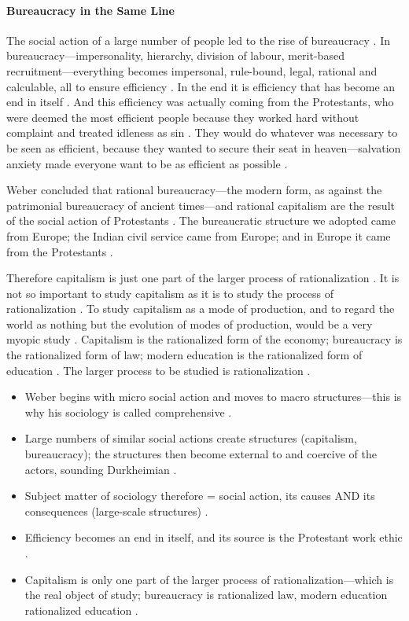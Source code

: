 \paragraph{Bureaucracy in the Same Line}
The social action of a large number of people led to the rise of bureaucracy . In bureaucracy---impersonality, hierarchy, division of labour, merit-based recruitment---everything becomes impersonal, rule-bound, legal, rational and calculable, all to ensure efficiency .
In the end it is efficiency that has become an end in itself . And this efficiency was actually coming from the Protestants, who were deemed the most efficient people because they worked hard without complaint and treated idleness as sin . They would do whatever was necessary to be seen as efficient, because they wanted to secure their seat in heaven---salvation anxiety made everyone want to be as efficient as possible .

\begin{KeyConcept}
Weber concluded that rational bureaucracy---the modern form, as against the patrimonial bureaucracy of ancient times---and rational capitalism are the result of the social action of Protestants .
The bureaucratic structure we adopted came from Europe; the Indian civil service came from Europe; and in Europe it came from the Protestants .

Therefore capitalism is just one part of the larger process of rationalization . It is not so important to study capitalism as it is to study the process of rationalization .
To study capitalism as a mode of production, and to regard the world as nothing but the evolution of modes of production, would be a very myopic study .
Capitalism is the rationalized form of the economy; bureaucracy is the rationalized form of law; modern education is the rationalized form of education . The larger process to be studied is rationalization .
\end{KeyConcept}

\begin{QuickRevision}
\begin{itemize}
    \item Weber begins with micro social action and moves to macro structures---this is why his sociology is called comprehensive .
    \item Large numbers of similar social actions create structures (capitalism, bureaucracy); the structures then become external to and coercive of the actors, sounding Durkheimian .
    \item Subject matter of sociology therefore = social action, its causes AND its consequences (large-scale structures) .
    \item Efficiency becomes an end in itself, and its source is the Protestant work ethic .
    \item Capitalism is only one part of the larger process of rationalization---which is the real object of study; bureaucracy is rationalized law, modern education rationalized education .
\end{itemize}
\end{QuickRevision}

